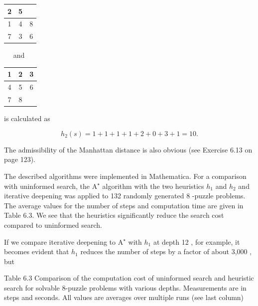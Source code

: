 \documentclass[10pt]{book}
\begin{document}
\begin{center}
\begin{tabular}{|c|c|c|}
\hline
2 & 5 &  \\
\hline
1 & 4 & 8 \\
\hline
7 & 3 & 6 \\
\hline\hline
\end{tabular}
\end{center}$\quad$ and $\quad$\begin{tabular}{|c|c|c|}
\hline
1 & 2 & 3 \\
\hline
4 & 5 & 6 \\
\hline
7 & 8 &  \\
\hline
\end{tabular}

is calculated as

$$
h_{2}(s)=1+1+1+1+2+0+3+1=10 .
$$

The admissibility of the Manhattan distance is also obvious (see Exercise 6.13 on page 123).

The described algorithms were implemented in Mathematica. For a comparison with uninformed search, the $\mathrm{A}^{\star}$ algorithm with the two heuristics $h_{1}$ and $h_{2}$ and iterative deepening was applied to 132 randomly generated 8 -puzzle problems. The average values for the number of steps and computation time are given in Table 6.3. We see that the heuristics significantly reduce the search cost compared to uninformed search.

If we compare iterative deepening to $\mathrm{A}^{\star}$ with $h_{1}$ at depth 12 , for example, it becomes evident that $h_{1}$ reduces the number of steps by a factor of about 3,000 , but

Table 6.3 Comparison of the computation cost of uninformed search and heuristic search for solvable 8-puzzle problems with various depths. Measurements are in steps and seconds. All values are averages over multiple runs (see last column)
\end{document}
